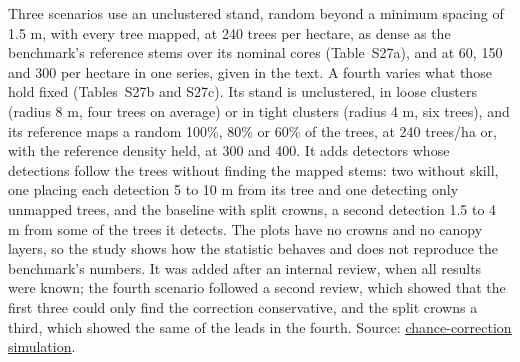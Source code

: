 \documentclass[10pt,a4paper]{article}
\begin{document}
Three scenarios use an unclustered stand, random beyond a minimum spacing of 1.5
m, with every tree mapped, at 240 trees per hectare, as dense as the benchmark's
reference stems over its nominal cores (Table~S27a), and at 60, 150 and 300 per
hectare in one series, given in the text. A fourth varies what those hold fixed
(Tables~S27b and S27c). Its stand is unclustered, in loose clusters (radius 8 m,
four trees on average) or in tight clusters (radius 4 m, six trees), and its
reference maps a random 100\%, 80\% or 60\% of the trees, at 240 trees/ha or, with
the reference density held, at 300 and 400. It adds detectors whose detections
follow the trees without finding the mapped stems: two without skill, one
placing each detection 5 to 10 m from its tree and one detecting only unmapped
trees, and the baseline with split crowns, a second detection 1.5 to 4 m from
some of the trees it detects. The plots have no crowns and no canopy layers, so
the study shows how the statistic behaves and does not reproduce the benchmark's
numbers. It was added after an internal review, when all results were known; the
fourth scenario followed a second review, which showed that the first three
could only find the correction conservative, and the split crowns a third, which
showed the same of the leads in the fourth. Source: \href{https://github.com/devakellc/lidar-tree-benchmark/blob/main/results/chance-correction-simulation-results.md}{chance-correction
simulation}.
\end{document}

